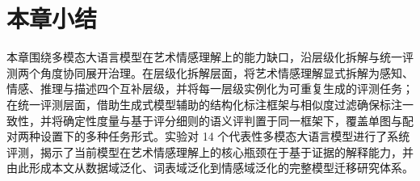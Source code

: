 
\FloatBarrier

\section{本章小结}

本章围绕多模态大语言模型在艺术情感理解上的能力缺口，沿层级化拆解与统一评测两个角度协同展开治理。在层级化拆解层面，将艺术情感理解显式拆解为感知、情感、推理与描述四个互补层级，并将每一层级实例化为可重复生成的评测任务；在统一评测层面，借助生成式模型辅助的结构化标注框架与相似度过滤确保标注一致性，并将确定性度量与基于评分细则的语义评判置于同一框架下，覆盖单图与配对两种设置下的多种任务形式。实验对 14 个代表性多模态大语言模型进行了系统评测，揭示了当前模型在艺术情感理解上的核心瓶颈在于基于证据的解释能力，并由此形成本文从数据域泛化、词表域泛化到情感域泛化的完整模型迁移研究体系。

